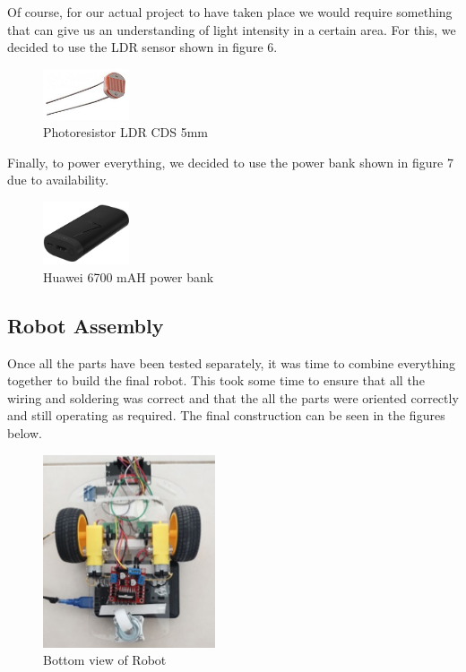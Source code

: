\documentclass[conference]{IEEEtran}
\begin{document}
    Of course, for our actual project to have taken place we would require
    something that can give us an understanding of light intensity in a certain
    area. For this, we decided to use the LDR sensor shown in figure 6.

    \begin{figure}[H]
        \centering
        \captionsetup{justification=centering}
        \centering
        \includegraphics[width=1in]{6.png}
        \caption{Photoresistor LDR CDS 5mm}  
        \label{6}
    \end{figure}

    Finally, to power everything, we decided to use the power bank shown in
    figure 7 due to availability.

    \begin{figure}[H]
        \centering
        \captionsetup{justification=centering}
        \centering
        \includegraphics[width=1in]{7.png}
        \caption{Huawei 6700 mAH power bank}  
        \label{6}
    \end{figure}

    \subsection{Robot Assembly}

    Once all the parts have been tested separately, it was time to
    combine everything together to build the final robot. This took some
    time to ensure that all the wiring and soldering was correct and
    that the all the parts were oriented correctly and still operating
    as required. The final construction can be seen in the figures below.

    \begin{figure}[H]
        \centering
        \captionsetup{justification=centering}
        \centering
        \includegraphics[width=2in]{8.png}
        \caption{Bottom view of Robot}  
        \label{6}
    \end{figure}
    
\end{document}
